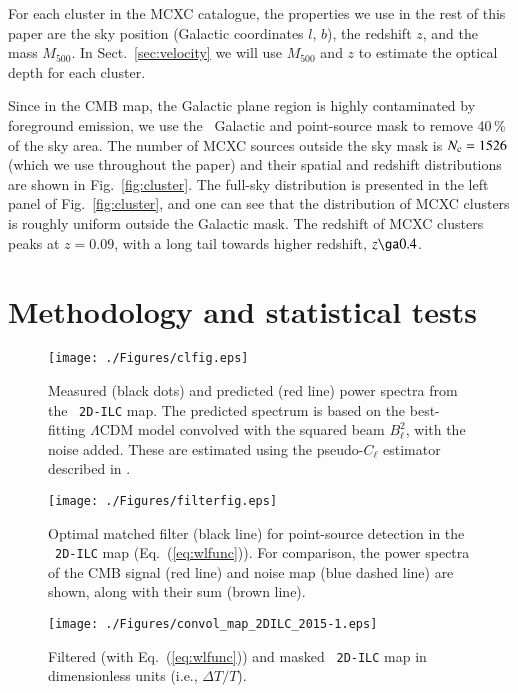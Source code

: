 \documentclass[traditabstract, longauth]{aa}
\newcommand{\1}{\'\i }
\begin{document}
For each cluster in the MCXC catalogue, the properties we use in the rest of
this paper are the sky position (Galactic
coordinates $l,\,b$), the redshift $z$, and the mass $M_{500}$. In
Sect.~\ref{sec:velocity} we will use $M_{500}$ and $z$ to estimate the optical
depth for each cluster.

Since in the CMB map, the Galactic plane region is highly contaminated by
foreground emission, we use the \Planck\ Galactic and point-source
mask to remove 40\,\% of the
sky area. The number of MCXC sources outside the sky mask is
$N_{\rm c}=1526$ (which we use throughout the paper) and their spatial and
redshift distributions are shown in Fig.~\ref{fig:cluster}.
The full-sky distribution is presented
in the left panel of Fig.~\ref{fig:cluster}, and one can see that the
distribution of MCXC clusters is roughly uniform outside the Galactic mask. The
redshift of MCXC clusters peaks at $z=0.09$, with a long tail towards higher
redshift, $z\ga0.4$.

\section{Methodology and statistical tests}
\label{sec:methodology}

\begin{figure}
\centering
\texttt{[image: ./Figures/clfig.eps]}
\caption[fig:cl]{Measured (black dots) and predicted (red line) power spectra
from the \Planck\ {\tt 2D-ILC} map. The predicted spectrum is based on the
best-fitting $\Lambda$CDM model convolved with the squared beam $B^2_{\ell}$,
with the noise added. These are estimated using the pseudo-$C_{\ell}$
estimator described in \citet{Hivon02}.}
\label{fig:cl}
\end{figure}

\begin{figure}
\centering
\texttt{[image: ./Figures/filterfig.eps]}
\caption[fig:filter]{Optimal matched filter (black line) for point-source
detection in the \Planck\ {\tt 2D-ILC} map (Eq.~(\ref{eq:wlfunc})). For
comparison, the power spectra of the CMB signal (red line) and noise map
(blue dashed line) are
shown, along with their sum (brown line).}
\label{fig:filter}
\end{figure}

\begin{figure}
\centering
\texttt{[image: ./Figures/convol\_map\_2DILC\_2015-1.eps]}
\caption[fig:convolve]{Filtered (with Eq.~(\ref{eq:wlfunc})) and masked {\tt
2D-ILC} map in dimensionless units (i.e., $\Delta T/T$).}
\label{fig:convolve}
\end{figure}
\end{document}
